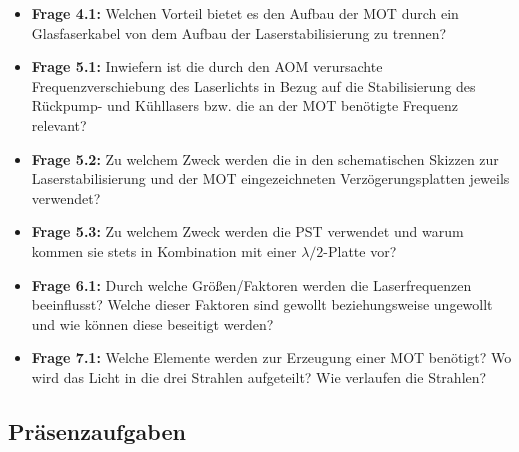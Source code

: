 \documentclass[
class=book,
accentcolor=1b,
custommargins=geometry,
fontsize=11pt,
thesis={type=Versuchsanleitung},
ruledheaders=all,
headline=false,
instbox=false,
marginpar=false,
title=small,
ignore-missing-data=true,
twoside=false,
logofile=apqdesign/tuda_logo.pdf,
pdfa=false %
]{apqpub}
\begin{document}
\begin{itemize}
	\item \textbf{Frage 4.1:} Welchen Vorteil bietet es den Aufbau der MOT durch ein Glasfaserkabel von dem Aufbau der Laserstabilisierung zu trennen?
	
	\item \textbf{Frage 5.1:} Inwiefern ist die durch den AOM verursachte Frequenzverschiebung des Laserlichts in Bezug auf die Stabilisierung des Rückpump- und Kühllasers bzw. die an der MOT benötigte Frequenz relevant?
	
	\item \textbf{Frage 5.2:} Zu welchem Zweck werden die in den schematischen Skizzen zur Laserstabilisierung und der MOT eingezeichneten Verzögerungsplatten jeweils verwendet?
	
	\item \textbf{Frage 5.3:} Zu welchem Zweck werden die PST verwendet und warum kommen sie stets in Kombination mit einer $\lambda/2$-Platte vor?  
	
	\item \textbf{Frage 6.1:} Durch welche Größen/Faktoren werden die Laserfrequenzen beeinflusst? Welche dieser Faktoren sind gewollt beziehungsweise ungewollt und wie können diese beseitigt werden?
	
	\item \textbf{Frage 7.1:} Welche Elemente werden zur Erzeugung einer MOT benötigt? Wo wird das Licht in die drei Strahlen aufgeteilt? Wie verlaufen die Strahlen?
\end{itemize}

\newpage

\subsection{Präsenzaufgaben}
\end{document}
